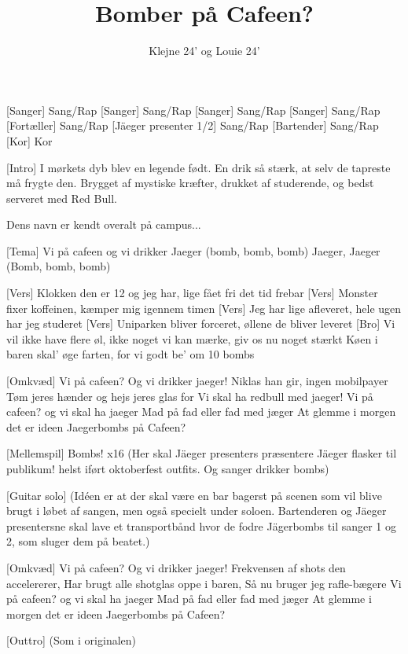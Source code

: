\documentclass[a4paper,11pt]{article}
\title{Bomber på Cafeen?}
\author{Klejne 24' og Louie 24'}
\begin{document}
\maketitle

\begin{roles}
[Sanger] Sang/Rap
[Sanger] Sang/Rap
[Sanger] Sang/Rap
[Sanger] Sang/Rap
[Fortæller] Sang/Rap
[Jäeger presenter 1/2] Sang/Rap
[Bartender] Sang/Rap
[Kor] Kor
\end{roles}

\begin{song}
[Intro]
  I mørkets dyb blev en legende født.
  En drik så stærk, at selv de tapreste må frygte den.
  Brygget af mystiske kræfter, drukket af studerende,
  og bedst serveret med Red Bull.

Dens navn er kendt overalt på campus...

[Tema]
Vi på cafeen og vi drikker Jaeger (bomb, bomb, bomb)
Jaeger, Jaeger (Bomb, bomb, bomb)

[Vers]
Klokken den er 12 og jeg har, lige fået fri det tid frebar
[Vers]
Monster fixer koffeinen, kæmper mig igennem timen
[Vers]
Jeg har lige afleveret, hele ugen har jeg studeret
[Vers]
Uniparken bliver forceret, øllene de bliver leveret
[Bro]
Vi vil ikke have flere øl, ikke noget vi kan mærke, giv os nu noget stærkt
Køen i baren skal’ øge farten, for vi godt be’ om 10 bombs


[Omkvæd]
Vi på cafeen? Og vi drikker jaeger! 
Niklas han gir, ingen mobilpayer
Tøm jeres hænder og hejs jeres glas for
Vi skal ha redbull med jaeger!
Vi på cafeen? og vi skal ha jaeger
Mad på fad eller fad med jæger
At glemme i morgen det er ideen
Jaegerbombs på Cafeen?

[Mellemspil]
Bombs! x16
(Her skal Jäeger presenters præsentere Jäeger flasker til publikum! helst iført oktoberfest outfits. Og sanger drikker bombs)

[Guitar solo]
(Idéen er at der skal være en bar bagerst på scenen som vil blive brugt i løbet af sangen, men også specielt under soloen. Bartenderen og Jäeger presentersne skal lave et transportbånd hvor de fodre Jägerbombs til sanger 1 og 2, som sluger dem på beatet.)

[Omkvæd]
Vi på cafeen? Og vi drikker jaeger! 
Frekvensen af shots den accelererer,
Har brugt alle shotglas oppe i baren,
Så nu bruger jeg rafle-bægere
Vi på cafeen? og vi skal ha jaeger
Mad på fad eller fad med jæger
At glemme i morgen det er ideen
Jaegerbombs på Cafeen?

\sings{}[Outtro]
(Som i originalen)
\end{song}
\end{document}
